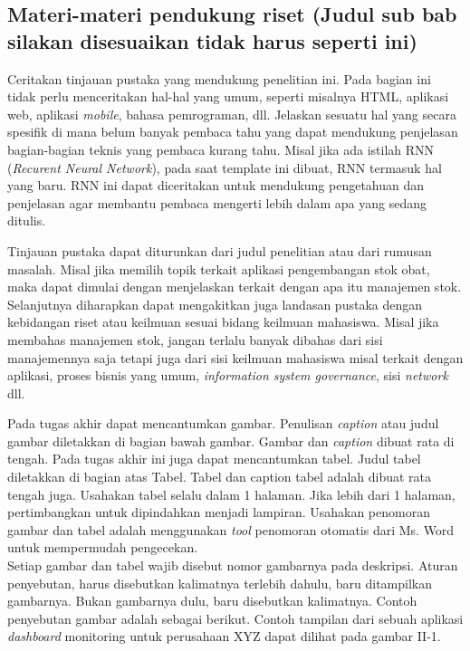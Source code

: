 \hypertarget{materi-materi-pendukung-riset-judul-sub-bab-silakan-disesuaikan-tidak-harus-seperti-ini}{%
\subsection{Materi-materi pendukung riset (Judul sub bab silakan
disesuaikan tidak harus seperti
ini)}\label{materi-materi-pendukung-riset-judul-sub-bab-silakan-disesuaikan-tidak-harus-seperti-ini}}

Ceritakan tinjauan pustaka yang mendukung penelitian ini. Pada bagian
ini tidak perlu menceritakan hal-hal yang umum, seperti misalnya HTML,
aplikasi web, aplikasi \emph{mobile}, bahasa pemrograman, dll. Jelaskan
sesuatu hal yang secara spesifik di mana belum banyak pembaca tahu yang
dapat mendukung penjelasan bagian-bagian teknis yang pembaca kurang
tahu. Misal jika ada istilah RNN (\emph{Recurent Neural Network}), pada
saat template ini dibuat, RNN termasuk hal yang baru. RNN ini dapat
diceritakan untuk mendukung pengetahuan dan penjelasan agar membantu
pembaca mengerti lebih dalam apa yang sedang ditulis.

Tinjauan pustaka dapat diturunkan dari judul penelitian atau dari
rumusan masalah. Misal jika memilih topik terkait aplikasi pengembangan
stok obat, maka dapat dimulai dengan menjelaskan terkait dengan apa itu
manajemen stok. Selanjutnya diharapkan dapat mengakitkan juga landasan
pustaka dengan kebidangan riset atau keilmuan sesuai bidang keilmuan
mahasiswa. Misal jika membahas manajemen stok, jangan terlalu banyak
dibahas dari sisi manajemennya saja tetapi juga dari sisi keilmuan
mahasiswa misal terkait dengan aplikasi, proses bisnis yang umum,
\emph{information system governance}, sisi \emph{network} dll.

Pada tugas akhir dapat mencantumkan gambar. Penulisan \emph{caption}
atau judul gambar diletakkan di bagian bawah gambar. Gambar dan
\emph{caption} dibuat rata di tengah. Pada tugas akhir ini juga dapat
mencantumkan tabel. Judul tabel diletakkan di bagian atas Tabel. Tabel
dan caption tabel adalah dibuat rata tengah juga. Usahakan tabel selalu
dalam 1 halaman. Jika lebih dari 1 halaman, pertimbangkan untuk
dipindahkan menjadi lampiran. Usahakan penomoran gambar dan tabel adalah
menggunakan \emph{tool} penomoran otomatis dari Ms. Word untuk
mempermudah pengecekan.\\
Setiap gambar dan tabel wajib disebut nomor gambarnya pada deskripsi.
Aturan penyebutan, harus disebutkan kalimatnya terlebih dahulu, baru
ditampilkan gambarnya. Bukan gambarnya dulu, baru disebutkan kalimatnya.
Contoh penyebutan gambar adalah sebagai berikut. Contoh tampilan dari
sebuah aplikasi \emph{dashboard} monitoring untuk perusahaan XYZ dapat
dilihat pada gambar II-1.

